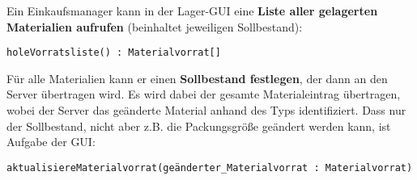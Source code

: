 Ein Einkaufsmanager kann in der Lager-GUI eine \textbf{Liste aller gelagerten Materialien aufrufen} (beinhaltet jeweiligen Sollbestand):

\texttt{holeVorratsliste() : Materialvorrat[]}

Für alle Materialien kann er einen \textbf{Sollbestand festlegen}, der dann an den Server übertragen wird. Es wird dabei der gesamte Materialeintrag übertragen, wobei der Server das geänderte Material anhand des Typs identifiziert. Dass nur der Sollbestand, nicht aber z.B. die Packungsgröße geändert werden kann, ist Aufgabe der GUI:

\texttt{aktualisiereMaterialvorrat(geänderter\_Materialvorrat : Materialvorrat)}